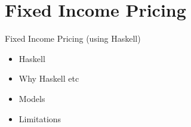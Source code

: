 \chapter{Fixed Income Pricing}
Fixed Income Pricing (using Haskell)
\begin{itemize}
\item Haskell
\item Why Haskell etc
\item Models
\item Limitations
\end{itemize}
